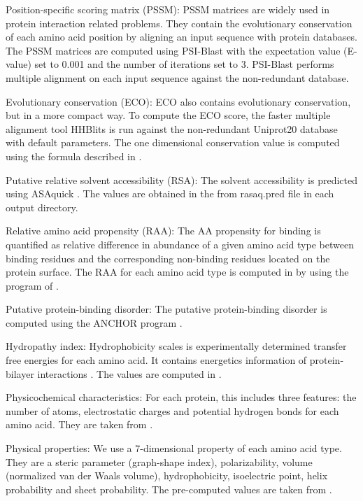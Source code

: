\documentclass{bioinfo}
\begin{document}
\begin{methods}
Position-specific scoring matrix (PSSM): PSSM matrices are widely used in protein interaction related problems. They contain the evolutionary conservation of each amino acid position by aligning an input sequence with protein databases. The PSSM matrices are computed using PSI-Blast \citep{altschul1997gapped} with the expectation value (E-value) set to 0.001 and the number of iterations set to 3. PSI-Blast performs multiple alignment on each input sequence against the non-redundant database. 

Evolutionary conservation (ECO): ECO also contains evolutionary conservation, but in a more compact way. To compute the ECO score, the faster multiple alignment tool HHBlits \citep{remmert2012hhblits} is run against the non-redundant Uniprot20 database with default parameters. The one dimensional conservation value is computed using the formula described in \citep{zhang2019comprehensive}.

Putative relative solvent accessibility (RSA): The solvent accessibility is predicted using ASAquick \citep{faraggi2014accurate}. The values are obtained in the from rasaq.pred file in each output directory.

Relative amino acid propensity (RAA): The AA propensity for binding is quantified as relative difference in abundance of a given amino acid type between binding residues and the corresponding non-binding residues located on the protein surface. The RAA for each amino acid type is computed in \citep{zhang2019comprehensive} by using the program of  \citep{vacic2007composition}.

Putative protein-binding disorder: The putative protein-binding disorder is computed using the ANCHOR program \citep{dosztanyi2009anchor}.

Hydropathy index: Hydrophobicity scales is experimentally determined transfer free energies for each amino acid. It contains energetics information of protein-bilayer interactions \citep{wimley1996experimentally}. The values are computed in \citep{kyte1982simple}.

Physicochemical characteristics: For each protein, this includes three features: the number of atoms, electrostatic charges and potential hydrogen bonds for each amino acid. They are taken from \citep{zhang2019sequence}.

Physical properties: We use a 7-dimensional property of each amino acid type. They are a steric parameter (graph-shape index), polarizability, volume (normalized van der Waals volume), hydrophobicity, isoelectric point, helix probability and sheet probability. The pre-computed values are taken from \citep{zhang2019sequence}.


\end{methods}
\end{document}
